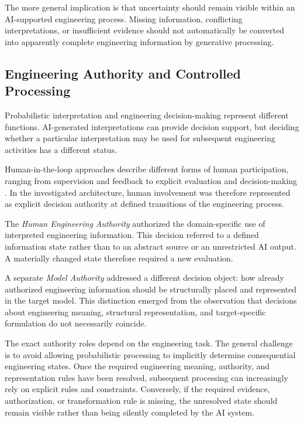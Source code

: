The more general implication is that uncertainty should remain visible within an
AI-supported engineering process. Missing information, conflicting interpretations, or
insufficient evidence should not automatically be converted into apparently complete
engineering information by generative processing.

\subsection{Engineering Authority and Controlled Processing}
\label{sec:challenge_authority}

Probabilistic interpretation and engineering decision-making represent different functions.
AI-generated interpretations can provide decision support, but deciding whether a
particular interpretation may be used for subsequent engineering activities has a different
status.

Human-in-the-loop approaches describe different forms of human participation, ranging from
supervision and feedback to explicit evaluation and decision-making
\cite{MosqueiraRey2023,Lazaros2026}. In the investigated architecture, human involvement
was therefore represented as explicit decision authority at defined transitions of the
engineering process.

The \emph{Human Engineering Authority} authorized the domain-specific use of interpreted
engineering information. This decision referred to a defined information state rather than
to an abstract source or an unrestricted AI output. A materially changed state therefore
required a new evaluation.

A separate \emph{Model Authority} addressed a different decision object: how already
authorized engineering information should be structurally placed and represented in the
target model. This distinction emerged from the observation that decisions about
engineering meaning, structural representation, and target-specific formulation do not
necessarily coincide.

The exact authority roles depend on the engineering task. The general challenge is to avoid
allowing probabilistic processing to implicitly determine consequential engineering states.
Once the required engineering meaning, authority, and representation rules have been
resolved, subsequent processing can increasingly rely on explicit rules and constraints.
Conversely, if the required evidence, authorization, or transformation rule is missing, the
unresolved state should remain visible rather than being silently completed by the AI
system.

